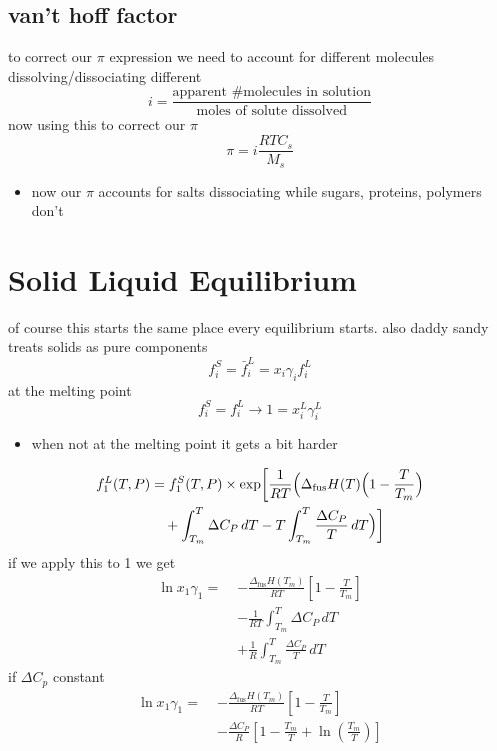 \documentclass{article}
\begin{document}
\subsection*{van't hoff factor}
to correct our $\pi$ expression we need to account for different molecules dissolving/dissociating different
\[
i = \frac{\text{apparent  \#  molecules in solution}}{\text{moles of solute dissolved}}
\]
now using this to correct our $\pi$
\[
\pi = i \frac{RTC_{s}}{M_{s}}
\]

\begin{itemize}
    \item now our $\pi$ accounts for salts dissociating while sugars, proteins, polymers don't
\end{itemize}

\section*{Solid Liquid Equilibrium}
of course this starts the same place every equilibrium starts. also daddy sandy treats solids as pure components
\[
f_{i}^{S} = \bar{f}_{i}^{L} = x_{i} \gamma_{i} f_{i}^{L} 
\]
at the melting point
\[
f_{i}^{S}=f_{i}^{L} \longrightarrow 1 = x_{i}^{L} \gamma_{i}^{L}
\]
\begin{itemize}
    \item when not at the melting point it gets a bit harder
\end{itemize}
\[
\begin{aligned}
f_1^L(T, P) &= f_1^S(T, P) \times \exp\biggl[
\frac{1}{RT} \Bigl(
\Delta_{\text{fus}} H(T) \Bigl(1 - \frac{T}{T_m}\Bigr) \\
&\quad + \int_{T_m}^{T} \Delta C_P \, dT 
- T \int_{T_m}^{T} \frac{\Delta C_P}{T} \, dT
\Bigr)
\biggr] \\
\end{aligned}
\]
if we apply this to 1 we get
\[
\begin{aligned}
\ln x_1 \gamma_1 =\; & -\frac{\Delta_{\text{fus}} H(T_m)}{RT} \left[1 - \frac{T}{T_m} \right] \\
                     & - \frac{1}{RT} \int_{T_m}^{T} \Delta C_P \, dT \\
                     & + \frac{1}{R} \int_{T_m}^{T} \frac{\Delta C_P}{T} \, dT
\end{aligned}
\]
if $\Delta C_{p}$ constant
\[
\begin{aligned}
\ln x_1 \gamma_1 =\; & - \frac{\Delta_{\text{fus}} H(T_m)}{RT} \left[ 1 - \frac{T}{T_m} \right] \\[8pt]
                    & - \frac{\Delta C_P}{R} \left[ 1 - \frac{T_m}{T} + \ln\left( \frac{T_m}{T} \right) \right]
\end{aligned}
\]
\end{document}
